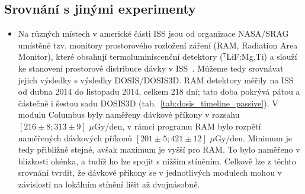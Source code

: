 \subsection{Srovnání s jinými experimenty}
\begin{itemize}
\item Na různých místech v americké části ISS jsou od organizace NASA/SRAG umístěné tzv. monitory prostorového rozložení záření (RAM, Radiation Area Monitor), které obsahují termoluminiscenční detektory ($^7$LiF:Mg,Ti) a slouží ke stanovení prostorové distribuce dávky v ISS~\cite{RAM}. Můžeme tedy srovnávat jejich výsledky s výsledky DOSIS/DOSIS3D. RAM detektory měřily na ISS od dubna 2014 do listopadu 2014, celkem 218 dní; tato doba pokrývá pátou a částečně i šestou sadu DOSIS3D (tab.~\ref{tab:dosis_timeline_passive}). V modulu Columbus byly naměřeny dávkové příkony v rozsahu $[216\pm8;313\pm9]$ $\mu$Gy/den, v rámci programu RAM bylo rozpětí naměřených dávkových příkonů $[201\pm5;421\pm12]$ $\mu$Gy/den. Minimum je tedy přibližně stejné, avšak maximum je vyšší pro RAM. To bylo naměřeno v
  blízkosti okénka, a tudíž ho lze spojit s nižším stíněním. Celkově lze z těchto srovnání tvrdit, že dávkové příkony se v jednotlivých modulech mohou v závislosti na lokálním stínění lišit až dvojnásobně.~\cite{dosis}


\end{itemize}
